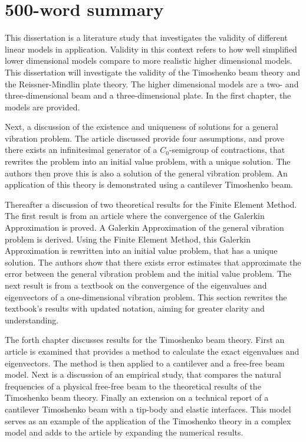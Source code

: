 \documentclass[../main.tex]{subfiles}
\begin{document}
\section{500-word summary}
This dissertation is a literature study that investigates the validity of different linear models in application. Validity in this context refers to how well simplified lower dimensional models compare to more realistic higher dimensional models. This dissertation will investigate the validity of the Timoshenko beam theory and the Reissner-Mindlin plate theory. The higher dimensional models are a two- and three-dimensional beam and a three-dimensional plate. In the first chapter, the models are provided.

Next, a discussion of the existence and uniqueness of solutions for a general vibration problem. The article discussed provide four assumptions, and prove there exists an infinitesimal generator of a $C_0$-semigroup of contractions, that rewrites the problem into an initial value problem, with a unique solution. The authors then prove this is also a solution of the general vibration problem. An application of this theory is demonstrated using a cantilever Timoshenko beam.

Thereafter a discussion of two theoretical results for the Finite Element Method. The first result is from an article where the convergence of the Galerkin Approximation is proved. A Galerkin Approximation of the general vibration problem is derived. Using the Finite Element Method, this Galerkin Approximation is rewritten into an initial value problem, that has a unique solution. The authors show that there exists error estimates that approximate the error between the general vibration problem and the initial value problem. The next result is from a textbook on the convergence of the eigenvalues and eigenvectors of a one-dimensional vibration problem. This section rewrites the textbook's results with updated notation, aiming for greater clarity and understanding.

The forth chapter discusses results for the Timoshenko beam theory. First an article is examined that provides a method to calculate the exact eigenvalues and eigenvectors. The method is then applied to a cantilever and a free-free beam model. Next is a discussion of an empirical study, that compares the natural frequencies of a physical free-free beam to the theoretical results of the Timoshenko beam theory. Finally an extension on a technical report of a cantilever Timoshenko beam with a tip-body and elastic interfaces. This model serves as an example of the application of the Timoshenko theory in a complex model and adds to the article by expanding the numerical results.
\end{document}
